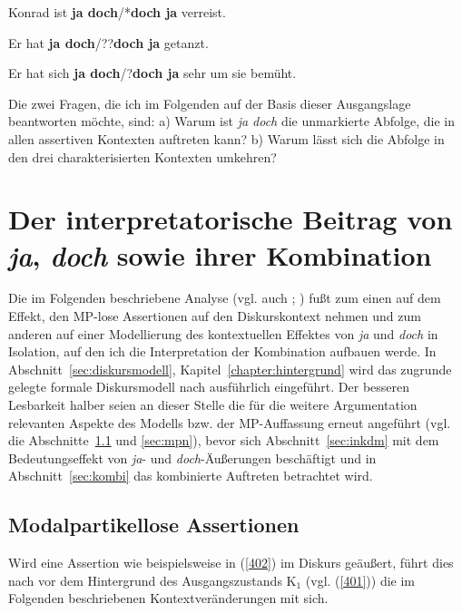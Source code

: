 \begin{exe}
	\ex\label{398} 
	Konrad ist \textbf{ja doch}/*\textbf{doch ja} verreist.
	\hfill\hbox {\citet[114]{Doherty1987}}
\end{exe}
\vspace{-0.5cm}	
\begin{exe}
	\ex\label{399} 
	Er hat \textbf{ja doch}/??\textbf{doch ja} getanzt.
	\hfill\hbox {\citet[20]{Struckmeier2014}}
\end{exe}
\vspace{-0.5cm}	
\begin{exe}
	\ex\label{400} 
	Er hat sich \textbf{ja doch}/?\textbf{doch ja} sehr um sie bemüht.
	\hfill\hbox {\citet[157]{Jacobs1991}}
\end{exe}
Die zwei Fragen, die ich im Folgenden auf der Basis dieser Ausgangslage beantworten möchte, sind: a) Warum ist \textit{ja doch} die unmarkierte Abfolge, die in allen assertiven Kontexten auftreten kann? b) Warum lässt sich die Abfolge in den drei charakterisierten Kontexten umkehren?
	
\section{Der interpretatorische Beitrag von \textit{ja}, \textit{doch} sowie ihrer Kombination}		
\label{sec:interpretationjd}			
Die im Folgenden beschriebene Analyse (vgl. auch \citealt[183-197]{Mueller2014a}; \citeyear[214-223]{Mueller2017b}) fußt zum einen auf dem Effekt, den MP-lose Assertionen auf den Diskurs\-kontext nehmen und zum anderen auf einer Modellierung des kontextuellen Effektes von \textit{ja} und \textit{doch} in Isolation, auf den ich die Interpretation der Kombination aufbauen werde. In Abschnitt~\ref{sec:diskursmodell}, Kapitel~\ref{chapter:hintergrund} wird das zugrunde gelegte formale Diskursmodell nach \citet{Farkas2010} ausführlich eingeführt. Der besseren Lesbarkeit halber seien an dieser Stelle die für die weitere Argumentation relevanten Aspekte des Modells bzw. der MP-Auffassung erneut angeführt (vgl. die Abschnitte~\ref{sec:mplass} und \ref{sec:mpn}), bevor sich Abschnitt~\ref{sec:inkdm} mit dem Bedeutungseffekt von \textit{ja}- und \textit{doch}-Äußerungen beschäftigt und in Abschnitt~\ref{sec:kombi} das kombinierte Auftreten betrachtet wird.
								
\subsection{Modalpartikellose Assertionen}
\label{sec:mplass}
Wird eine Assertion wie beispielsweise in (\ref{402}) im Diskurs geäußert, führt dies nach \citet{Farkas2010} vor dem Hintergrund des Ausgangszustands K$_{1}$ (vgl. (\ref{401})) die im Folgenden beschriebenen Kontextveränderungen mit sich.
     
